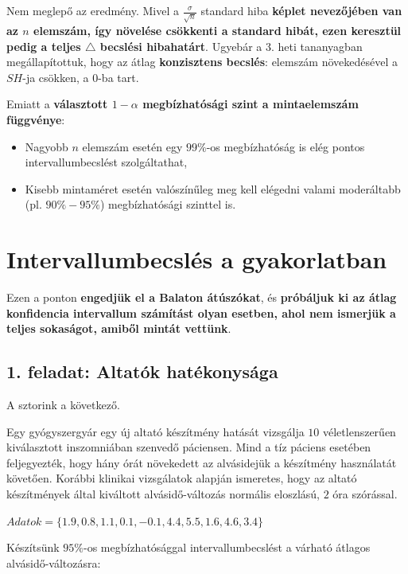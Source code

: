 \documentclass[
]{book}
\providecommand{\tightlist}{%
  \setlength{\itemsep}{0pt}\setlength{\parskip}{0pt}}
\begin{document}
Nem meglepő az eredmény. Mivel a \(\frac{\sigma}{\sqrt{n}}\) standard hiba \textbf{képlet nevezőjében van az \(n\) elemszám, így növelése csökkenti a standard hibát, ezen keresztül pedig a teljes \(\triangle\) becslési hibahatárt}. Ugyebár a 3. heti tananyagban megállapítottuk, hogy az átlag \textbf{konzisztens becslés}: elemszám növekedésével a \(SH\)-ja csökken, a \(0\)-ba tart.

Emiatt a \textbf{választott \(1-\alpha\) megbízhatósági szint a mintaelemszám függvénye}:

\begin{itemize}
\tightlist
\item
  Nagyobb \(n\) elemszám esetén egy \(99\%\)-os megbízhatóság is elég pontos intervallumbecslést szolgáltathat,
\item
  Kisebb mintaméret esetén valószínűleg meg kell elégedni valami moderáltabb (pl. \(90\%-95\%\)) megbízhatósági szinttel is.
\end{itemize}

\section{Intervallumbecslés a gyakorlatban}\label{intervallumbecsluxe9s-a-gyakorlatban}

Ezen a ponton \textbf{engedjük el a Balaton átúszókat}, és \textbf{próbáljuk ki az átlag konfidencia intervallum számítást olyan esetben, ahol nem ismerjük a teljes sokaságot, amiből mintát vettünk}.

\subsection*{1. feladat: Altatók hatékonysága}\label{feladat-altatuxf3k-hatuxe9konysuxe1ga}

A sztorink a következő.

Egy gyógyszergyár egy új altató készítmény hatását vizsgálja \(10\) véletlenszerűen kiválasztott inszomniában szenvedő páciensen. Mind a tíz páciens esetében feljegyezték, hogy hány órát növekedett az alvásidejük a készítmény használatát követően. Korábbi klinikai vizsgálatok alapján ismeretes, hogy az altató készítmények által kiváltott alvásidő-változás normális eloszlású, \(2\) óra szórással.

\(Adatok = \{1.9, 0.8, 1.1, 0.1, -0.1, 4.4, 5.5, 1.6, 4.6, 3.4\}\)

Készítsünk \(95\%\)-os megbízhatósággal intervallumbecslést a várható átlagos alvásidő-változásra:
\end{document}

